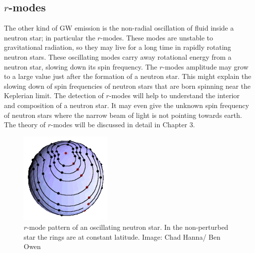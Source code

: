 \documentclass{ttuthes2007}
\begin{document}
\subsection{$r$-modes}
The other kind of \ac{GW} emission is the non-radial oscillation of fluid
inside a neutron star; in particular the $r$-modes. These modes are unstable to
gravitational radiation, so they may live for a long time in rapidly rotating neutron
stars. These oscillating modes carry away rotational energy from a neutron star,
slowing down its spin frequency. The $r$-modes amplitude may grow to a large value just
after the formation of a neutron star. This might explain the
slowing down of spin frequencies of neutron stars that are born spinning near the Keplerian
limit. The detection of $r$-modes will help to
understand the interior and composition of a neutron star. It may even give the
unknown spin frequency of neutron stars where the narrow beam of light is not
pointing towards earth. The theory of $r$-modes will be discussed in detail in
Chapter 3.
\begin{figure}
\centering
	\includegraphics[width=0.4\textwidth]{figure/333.png}
	\caption{$r$-mode pattern of an oscillating neutron star. In the
non-perturbed star the rings are at constant latitude. Image: Chad
Hanna/ Ben Owen}
\end{figure}
\end{document}
